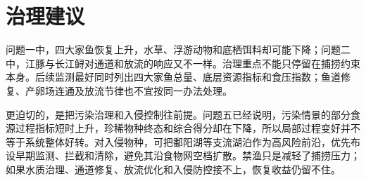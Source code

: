 \section{治理建议}
问题一中，四大家鱼恢复上升，水草、浮游动物和底栖饵料却可能下降；问题二中，江豚与长江鲟对通道和放流的响应又不一样。治理重点不能只停留在捕捞约束本身。后续监测最好同时列出四大家鱼总量、底层资源指标和食压指数；鱼道修复、产卵场连通及放流节律也不宜按同一办法处理。

更迫切的，是把污染治理和入侵控制往前提。问题五已经说明，污染情景的部分食源过程指标短时上升，珍稀物种终态和综合得分却在下降，所以局部过程变好并不等于系统整体好转。对入侵物种，可把鄱阳湖等支流湖泊作为高风险前沿，优先布设早期监测、拦截和清除，避免其沿食物网空档扩散。禁渔只是减轻了捕捞压力；如果水质治理、通道修复、放流优化和入侵防控接不上，恢复收益仍留不住。

